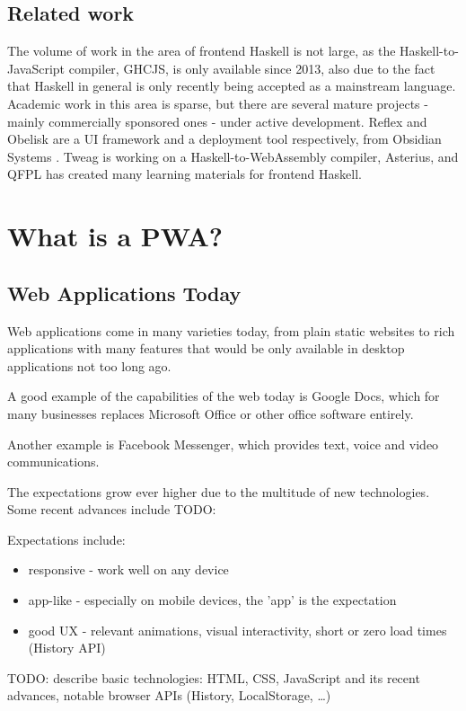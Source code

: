 \documentclass[english,odsaz]{fitthesis}
\begin{document}
\section{Related work}
\label{sec:org93cab55}
The volume of work in the area of frontend Haskell is not large, as the
Haskell-to-JavaScript compiler, GHCJS, is only available since 2013, also due to
the fact that Haskell in general is only recently being accepted as a mainstream
language. Academic work in this area is sparse, but there are several mature
projects - mainly commercially sponsored ones - under active development. Reflex
and Obelisk are a UI framework and a deployment tool respectively, from Obsidian
Systems \cite{obsidian}. Tweag \cite{tweag} is working on a Haskell-to-WebAssembly
compiler, Asterius, and QFPL \cite{qfpl} has created many learning materials for
frontend Haskell.

\chapter{What is a PWA?}
\label{sec:org2643b75}
\section{Web Applications Today}
\label{sec:orgd37e75f}
Web applications come in many varieties today, from plain static websites to
rich applications with many features that would be only available in desktop
applications not too long ago.

A good example of the capabilities of the web today is Google Docs, which for
many businesses replaces Microsoft Office or other office software entirely.

Another example is Facebook Messenger, which provides text, voice and video
communications.

The expectations grow ever higher due to the multitude of new technologies. Some
recent advances include TODO:

Expectations include:
\begin{itemize}
\item responsive - work well on any device
\item app-like - especially on mobile devices, the 'app' is the expectation
\item good UX - relevant animations, visual interactivity, short or zero load times
(History API)
\end{itemize}

TODO: describe basic technologies: HTML, CSS, JavaScript and its recent
advances, notable browser APIs (History, LocalStorage, \ldots{})
\end{document}
